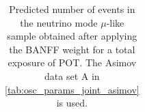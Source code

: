 \begin{table}
\begin{tabular} { | l ||r | r | r | r | r | r | | r | }
\end{tabular}
\caption{
Predicted number of events in the neutrino mode $\mu$-like sample
obtained after applying the BANFF weight
for a total exposure of \TotalPotNuRunOneSevenC{} POT.
The Asimov data set A in \cref{tab:osc_params_joint_asimov} is used.
}
\label{tab:events_1rmu_Asimov_A_Run17c}
\end{table}


